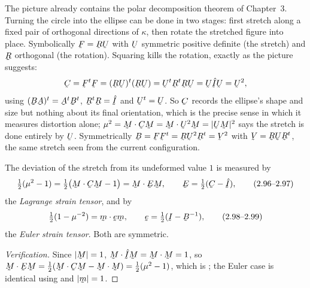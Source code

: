 \begin{remark}
\label{rem:polarpreview}
The picture already contains the polar decomposition theorem of Chapter~3.
Turning the circle into the ellipse can be done in two stages: first stretch
along a fixed pair of orthogonal directions of $\kappa$, then rotate the
stretched figure into place. Symbolically $\bF=\bR\bU$ with $\bU$ symmetric
positive definite (the stretch) and $\bR$ orthogonal (the rotation).
Squaring kills the rotation, exactly as the picture suggests:
\[
   \bC=\bF^{t}\bF=(\bR\bU)^{t}(\bR\bU)=\bU^{t}\bR^{t}\bR\bU=\bU\hat\I\bU=\bU^{2},
\]
using $(\bB\bA)^{t}=\bA^{t}\bB^{t}$, $\bR^{t}\bR=\hat\I$ and
$\bU^{t}=\bU$. So $\bC$ records the ellipse's shape and size but nothing
about its final orientation, which is the precise sense in which it measures
distortion alone; $\mu^2=\ip\bM{\bC\bM}=\ip\bM{\bU^2\bM}=|\bU\bM|^2$ says the
stretch is done entirely by $\bU$. Symmetrically
$\bB=\bF\bF^{t}=\bR\bU^{2}\bR^{t}=\bV^{2}$ with $\bV=\bR\bU\bR^{t}$, the same
stretch seen from the current configuration.
\end{remark}

\begin{definition}\label{def:strains}
The deviation of the stretch from its undeformed value $1$ is measured by
\begin{equation}
   \tfrac12(\mu^{2}-1)=\tfrac12\big(\ip\bM{\bC\bM}-1\big)=\ip\bM{\bE\bM},
   \qquad \bE=\tfrac12(\bC-\hat\I), \tag{2.96--2.97}\label{eq:2.96}
\end{equation}
the \emph{Lagrange strain tensor}, and by
\begin{equation}
   \tfrac12(1-\mu^{-2})=\ip\bmm{\vek{e}\bmm},
   \qquad \vek{e}=\tfrac12(\I-\bB^{-1}), \tag{2.98--2.99}\label{eq:2.98}
\end{equation}
the \emph{Euler strain tensor}. Both are symmetric.
\end{definition}

\begin{proof}[Verification]
Since $|\bM|=1$, $\ip\bM{\hat\I\bM}=\ip\bM\bM=1$, so
$\ip\bM{\bE\bM}=\tfrac12(\ip\bM{\bC\bM}-\ip\bM\bM)=\tfrac12(\mu^{2}-1)$,
which is ; the Euler case is identical using  and
$|\bmm|=1$.
\end{proof}

